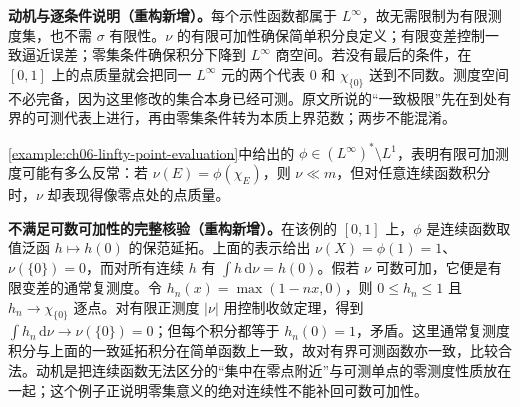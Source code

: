 \documentclass[../../main.tex]{subfiles}
\begin{document}
\begin{remark}
\textbf{动机与逐条件说明（重构新增）。}每个示性函数都属于 $L^\infty$，故无需限制为有限测度集，也不需 $\sigma$ 有限性。$
\nu$ 的有限可加性确保简单积分良定义；有限变差控制一致逼近误差；零集条件确保积分下降到 $L^\infty$ 商空间。若没有最后的条件，在 $[0,1]$ 上的点质量就会把同一 $L^\infty$ 元的两个代表 $0$ 和 $\chi_{\{0\}}$ 送到不同数。测度空间不必完备，因为这里修改的集合本身已经可测。原文所说的“一致极限”先在到处有界的可测代表上进行，再由零集条件转为本质上界范数；两步不能混淆。
\end{remark}

\cref{example:ch06-linfty-point-evaluation}中给出的 $\phi\in(L^\infty)^*\setminus L^1$，表明有限可加测度可能有多么反常：若 $\nu(E)=\phi(\chi_E)$，则 $\nu\ll m$，但对任意连续函数积分时，$\nu$ 却表现得像零点处的点质量。
\begin{remark}
\textbf{不满足可数可加性的完整核验（重构新增）。}在该例的 $[0,1]$ 上，$\phi$ 是连续函数取值泛函 $h\mapsto h(0)$ 的保范延拓。上面的表示给出 $\nu(X)=\phi(1)=1$、$\nu(\{0\})=0$，而对所有连续 $h$ 有 $\int h\,\mathrm d\nu=h(0)$。假若 $\nu$ 可数可加，它便是有限变差的通常复测度。令 $h_n(x)=\max(1-nx,0)$，则 $0\leqslant h_n\leqslant1$ 且 $h_n\to\chi_{\{0\}}$ 逐点。对有限正测度 $|\nu|$ 用控制收敛定理，得到 $\int h_n\,\mathrm d\nu\to\nu(\{0\})=0$；但每个积分都等于 $h_n(0)=1$，矛盾。这里通常复测度积分与上面的一致延拓积分在简单函数上一致，故对有界可测函数亦一致，比较合法。动机是把连续函数无法区分的“集中在零点附近”与可测单点的零测度性质放在一起；这个例子正说明零集意义的绝对连续性不能补回可数可加性。
\end{remark}
\end{document}
